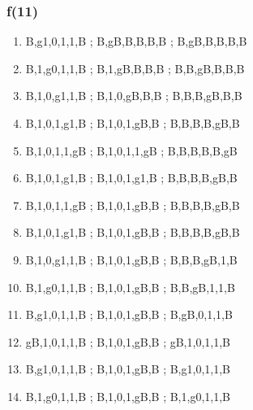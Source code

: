 \documentclass[leqno]{article}
\begin{document}
            \subsubsection{f(11)}
                \begin{enumerate}
                    \item {}                 {B,g1,0,1,1,B ; B,gB,B,B,B,B ; B,gB,B,B,B,B}
                    \item {}                {B,1,g0,1,1,B ; B,1,gB,B,B,B ; B,B,gB,B,B,B}
                    \item {}               {B,1,0,g1,1,B ; B,1,0,gB,B,B ; B,B,B,gB,B,B}
                    \item {}              {B,1,0,1,g1,B ; B,1,0,1,gB,B ; B,B,B,B,gB,B}
                    \item {}            {B,1,0,1,1,gB ; B,1,0,1,1,gB ; B,B,B,B,B,gB}
                    \item {}              {B,1,0,1,g1,B ; B,1,0,1,g1,B ; B,B,B,B,gB,B}
                    \item {}             {B,1,0,1,1,gB ; B,1,0,1,gB,B ; B,B,B,B,gB,B}
                    \item {}              {B,1,0,1,g1,B ; B,1,0,1,gB,B ; B,B,B,B,gB,B}
                    \item {}             {B,1,0,g1,1,B ; B,1,0,1,gB,B ; B,B,B,gB,1,B}
                    \item {}            {B,1,g0,1,1,B ; B,1,0,1,gB,B ; B,B,gB,1,1,B}
                    \item {}        {B,g1,0,1,1,B ; B,1,0,1,gB,B ; B,gB,0,1,1,B}
                    \item {}      {gB,1,0,1,1,B ; B,1,0,1,gB,B ; gB,1,0,1,1,B}
                    \item {}        {B,g1,0,1,1,B ; B,1,0,1,gB,B ; B,g1,0,1,1,B}
                    \item {}        {B,1,g0,1,1,B ; B,1,0,1,gB,B ; B,1,g0,1,1,B}

\end{enumerate}
\end{document}
